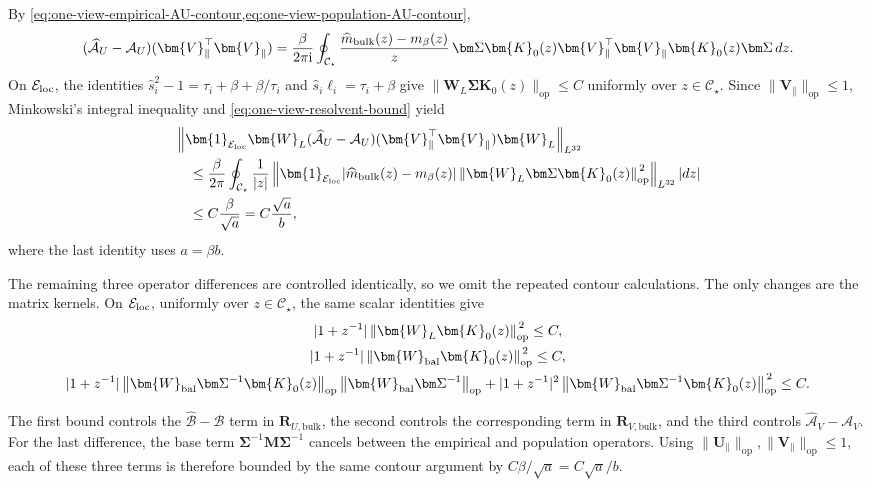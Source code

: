 \documentclass[11pt]{article}
\newcommand{\ind}{\bm{1}}
\newcommand{\trans}{\top}
\newcommand{\opn}[1]{\left\lVert #1\right\rVert_{\mathrm{op}}}
\newcommand{\Lqn}[2]{\left\lVert #1\right\rVert_{L^{#2}}}
\newcommand{\cE}{\mathcal{E}}
\begin{document}
By
\cref{eq:one-view-empirical-AU-contour,eq:one-view-population-AU-contour},
\[
  (\widehat{\mathcal A}_U-\mathcal A_U)
  (\bm{V}_\parallel^\trans\bm{V}_\parallel)
  =
  \frac{\beta}{2\pi\mathrm i}
  \oint_{\mathcal C_\star}
  \frac{\widehat m_{\rm bulk}(z)-m_\beta(z)}{z}\,
  \bm\Sigma\bm{K}_0(z)
  \bm{V}_\parallel^\trans\bm{V}_\parallel
  \bm{K}_0(z)\bm\Sigma\,dz.
\]
On $\cE_{\rm loc}$, the identities
$\widehat s_i^2-1=\tau_i+\beta+\beta/\tau_i$ and
$\widehat s_i\ell_i=\tau_i+\beta$ give
$\|\bm{W}_L\bm\Sigma\bm{K}_0(z)\|_{\mathrm{op}}\le C$ uniformly over
$z\in\mathcal C_\star$.  Since $\|\bm{V}_\parallel\|_{\mathrm{op}}\le1$, Minkowski's integral
inequality and \cref{eq:one-view-resolvent-bound} yield
\begin{align*}
&\Lqn{
  \ind_{\cE_{\rm loc}}
  \bm{W}_L
  (\widehat{\mathcal A}_U-\mathcal A_U)
  (\bm{V}_\parallel^\trans\bm{V}_\parallel)
  \bm{W}_L
}{32}\\
&\quad\le
\frac{\beta}{2\pi}
\oint_{\mathcal C_\star}
\frac{1}{|z|}
\left\|
  \ind_{\cE_{\rm loc}}
  |\widehat m_{\rm bulk}(z)-m_\beta(z)|
  \opn{\bm{W}_L\bm\Sigma\bm{K}_0(z)}^{\,2}
\right\|_{L^{32}}
|dz|\\
&\quad\le
C\frac{\beta}{\sqrt a}
=
C\frac{\sqrt a}{b},
\end{align*}
where the last identity uses $a=\beta b$.

The remaining three operator differences are controlled identically, so
we omit the repeated contour calculations.  The only changes are the
matrix kernels.  On $\cE_{\rm loc}$, uniformly over $z\in\mathcal C_\star$, the
same scalar identities give
\[
\begin{gathered}
  |1+z^{-1}|\opn{\bm{W}_L\bm{K}_0(z)}^{\,2}\le C,\\
  |1+z^{-1}|\opn{\bm{W}_{\rm bal}\bm{K}_0(z)}^{\,2}\le C,\\
  |1+z^{-1}|
  \opn{\bm{W}_{\rm bal}\bm\Sigma^{-1}\bm{K}_0(z)}
  \opn{\bm{W}_{\rm bal}\bm\Sigma^{-1}}
  +
  |1+z^{-1}|^2
  \opn{\bm{W}_{\rm bal}\bm\Sigma^{-1}\bm{K}_0(z)}^{\,2}
  \le C.
\end{gathered}
\]


The first bound controls the $\widehat{\mathcal B}-\mathcal B$ term
in $\bm{R}_{U,\mathrm{bulk}}$, the second controls the corresponding term
in $\bm{R}_{V,\mathrm{bulk}}$, and the third controls
$\widehat{\mathcal A}_V-\mathcal A_V$.  For the last difference, the
base term $\bm\Sigma^{-1}\bm{M}\bm\Sigma^{-1}$ cancels between the
empirical and population operators.  Using
$\|\bm{U}_\parallel\|_{\mathrm{op}},\|\bm{V}_\parallel\|_{\mathrm{op}}\le1$, each of these three
terms is therefore bounded by the same contour argument by
$C\beta/\sqrt a=C\sqrt a/b$.
\end{document}
